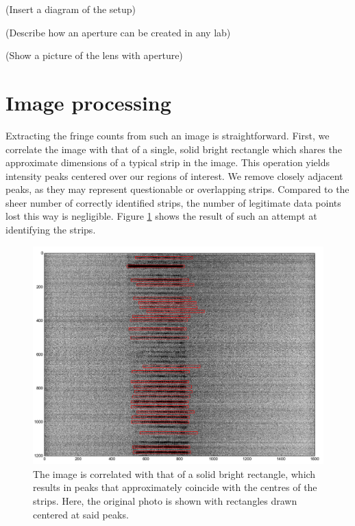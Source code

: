 \documentclass[10pt]{book}
\begin{document}
(Insert a diagram of the setup)

(Describe how an aperture can be created in any lab)

(Show a picture of the lens with aperture)

\section{Image processing}
\label{sec:ipi-slitprocessing}
Extracting the fringe counts from such an image is straightforward. First, we
correlate the image with that of a single, solid bright rectangle which shares
the approximate dimensions of a typical strip in the image. This operation
yields intensity
peaks centered over our regions of interest. We remove closely adjacent peaks,
as they may represent questionable or overlapping strips. Compared to the sheer
number of correctly identified strips, the number of legitimate data points lost
this way is negligible. Figure \ref{fig:globalsizing-identifystrips} shows the
result of such an attempt at identifying the strips.

\begin{figure}[h]
    \centering
    \includegraphics[height=0.38\textheight]{img/globalsizing-identifystrips.png}
    \caption{The image is correlated with that of a solid bright rectangle, which
        results in peaks that approximately coincide with the centres of the
        strips. Here, the original photo is shown with rectangles drawn centered
    at said peaks.}
    \label{fig:globalsizing-identifystrips}
\end{figure}
\end{document}
